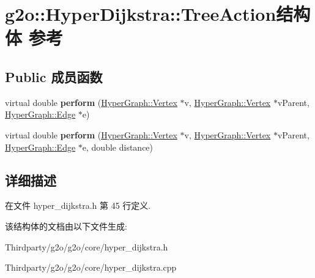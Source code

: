 \hypertarget{structg2o_1_1HyperDijkstra_1_1TreeAction}{\section{g2o\-:\-:Hyper\-Dijkstra\-:\-:Tree\-Action结构体 参考}
\label{structg2o_1_1HyperDijkstra_1_1TreeAction}
}
\subsection*{Public 成员函数}
\begin{DoxyCompactItemize}
\item 
\hypertarget{structg2o_1_1HyperDijkstra_1_1TreeAction_aacd1280762e801f05b04874950cf052b}{virtual double {\bfseries perform} (\hyperlink{classg2o_1_1HyperGraph_1_1Vertex}{Hyper\-Graph\-::\-Vertex} $\ast$v, \hyperlink{classg2o_1_1HyperGraph_1_1Vertex}{Hyper\-Graph\-::\-Vertex} $\ast$v\-Parent, \hyperlink{classg2o_1_1HyperGraph_1_1Edge}{Hyper\-Graph\-::\-Edge} $\ast$e)}\label{structg2o_1_1HyperDijkstra_1_1TreeAction_aacd1280762e801f05b04874950cf052b}

\item 
\hypertarget{structg2o_1_1HyperDijkstra_1_1TreeAction_a2f78bac199af9afea7105f3dd9f2e963}{virtual double {\bfseries perform} (\hyperlink{classg2o_1_1HyperGraph_1_1Vertex}{Hyper\-Graph\-::\-Vertex} $\ast$v, \hyperlink{classg2o_1_1HyperGraph_1_1Vertex}{Hyper\-Graph\-::\-Vertex} $\ast$v\-Parent, \hyperlink{classg2o_1_1HyperGraph_1_1Edge}{Hyper\-Graph\-::\-Edge} $\ast$e, double distance)}\label{structg2o_1_1HyperDijkstra_1_1TreeAction_a2f78bac199af9afea7105f3dd9f2e963}

\end{DoxyCompactItemize}


\subsection{详细描述}


在文件 hyper\-\_\-dijkstra.\-h 第 45 行定义.



该结构体的文档由以下文件生成\-:\begin{DoxyCompactItemize}
\item 
Thirdparty/g2o/g2o/core/hyper\-\_\-dijkstra.\-h\item 
Thirdparty/g2o/g2o/core/hyper\-\_\-dijkstra.\-cpp\end{DoxyCompactItemize}
